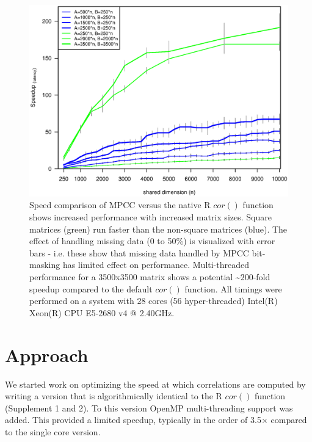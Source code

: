 \documentclass{bioinfo}
\begin{document}
\begin{figure}[H]
\centering
\includegraphics[width=\linewidth]{img/figure02big.eps}
  \caption{ \small Speed comparison of MPCC versus the native R $cor()$
  function shows increased performance with increased matrix
  sizes. Square matrices (green) run faster than the non-square
  matrices (blue).  The effect of handling missing data (0 to 50\%) is
  visualized with error bars - i.e. these show that missing data
  handled by MPCC bit-masking has limited effect on performance.
  Multi-threaded performance for a 3500x3500 matrix shows a potential
   \textasciitilde{}$200$-fold speedup compared to the default $cor()$ function.  All
  timings were performed on a system with 28 cores (56 hyper-threaded)
  Intel(R) Xeon(R) CPU E5-2680 v4 @ 2.40GHz.  } \label{fig:fig1}
\end{figure}

\vspace*{-10mm}


\section{Approach}

We started work on optimizing the speed at which correlations are computed 
by writing a version that is algorithmically identical to the R $cor()$ function
(Supplement 1 and 2). To this version OpenMP multi-threading support was added. 
This provided a limited speedup, typically in the order of
3.5$\times$ compared to the single core version. 
\end{document}
